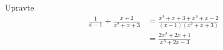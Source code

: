 \begin{mdframed}[style=mdexam]
  \begin{example}\label{MAI:exam116}
    Upravte
    \begin{align*}
      \frac{1}{x-1}+\frac{x+2}{x^2+x+3} 
        &= \frac{x^2+x+3+x^2+x-2}{(x-1)(x^2+x+3)}                \\
        &= \frac{2x^2+2x+1}{x^3+2x-3}
    \end{align*}  
  \end{example}
\end{mdframed}